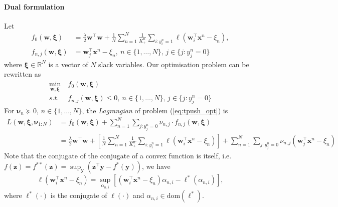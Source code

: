 \documentclass[9pt]{extarticle}
\newcommand{\x}{\mathbf{x}}
\newcommand{\y}{\mathbf{y}}
\newcommand{\z}{\mathbf{z}}
\newcommand{\1}{\mathbf{1}}
\newcommand{\w}{\mathbf{w}}
\newcommand{\R}{\mathbb{R}}
\newcommand{\nubm}{\bm{\nu}}
\newcommand{\xibm}{\bm{\xi}}
\newcommand{\ie}{i.e.\ }
\begin{document}
\paragraph{Dual formulation}
Let
\begin{align*}
f_0(\w, \xibm)     &= \frac{\lambda}{2} \w^\top \w + \frac{1}{N} \sum_{n=1}^N \frac{1}{K_+^n} \sum_{i:y_i^n=1} \ell \left( \w_i^\top \x^n - \xi_n \right), \\
f_{n,j}(\w, \xibm) &= \w_j^\top \x^n - \xi_n, \ n \in \{1,\dots,N\}, \, j \in \{j: y_j^n = 0\}
\end{align*}
where $\xibm \in \R^{N}$ is a vector of $N$ slack variables.
%
Our optimisation problem can be rewritten as
\begin{equation}
\label{eq:tpush_opt}
\begin{aligned}
\min_{\w, \xibm} \ & f_0(\w, \xibm) \\
s.t.             \ & f_{n,j}(\w, \xibm) \le 0, \ n \in \{1,\dots,N\}, \, j \in \{j: y_j^n = 0\}
\end{aligned}
\end{equation}
%
For $\nubm_n \succeq 0, \, n \in \{1,\dots,N\}$, the \emph{Lagrangian} of problem (\ref{eq:tpush_opt}) is
\begin{equation}
\label{eq:tpush_lg}
\begin{aligned}
L(\w, \xibm, \nubm_{1:N}) 
&= f_0(\w, \xibm) + \sum_{n=1}^N \sum_{j:y_j^n=0} \nu_{n,j} \cdot f_{n,j}(\w, \xibm) \\
&= \frac{\lambda}{2} \w^\top \w + \left[ \frac{1}{N} \sum_{n=1}^N \frac{1}{K_+^n} \sum_{i:y_i^n=1} \ell \left( \w_i^\top \x^n - \xi_n \right) \right] +
   \sum_{n=1}^N \sum_{j:y_j^n=0} \nu_{n,j} \left( \w_j^\top \x^n - \xi_n \right)
\end{aligned}
\end{equation}
%
Note that the conjugate of the conjugate of a convex function is itself, 
\ie $f(\z) = f^{**}(\z) = \sup_{\y} \left( \z^\top \y - f^*(\y) \right)$, we have
\begin{equation}
\label{eq:conjugate}
\ell( \w_i^\top \x^n - \xi_n) = \sup_{\alpha_{n,i}} \left[ \left( \w_i^\top \x^n - \xi_n \right) \alpha_{n,i} - \ell^*(\alpha_{n,i}) \right],
\end{equation}
where $\ell^*(\cdot)$ is the conjugate of $\ell(\cdot)$ and $\alpha_{n,i} \in \text{dom}(\ell^*)$.
\end{document}
